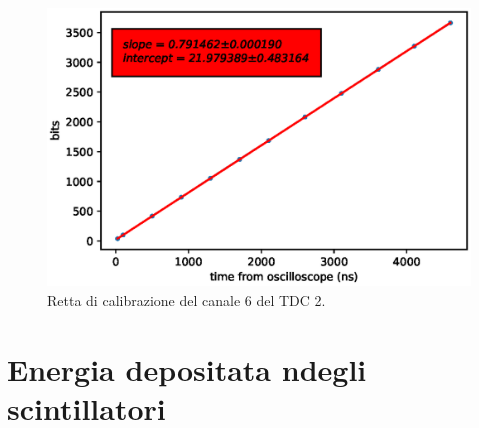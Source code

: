 \begin{figure}[H]
  \centering
  \includegraphics[width=.8\textwidth]{plots/tdc26.eps}
  \caption{Retta di calibrazione del canale 6 del TDC 2.}
  \label{fig:tdc26}
\end{figure}




\chapter{Energia depositata ndegli scintillatori}             %


